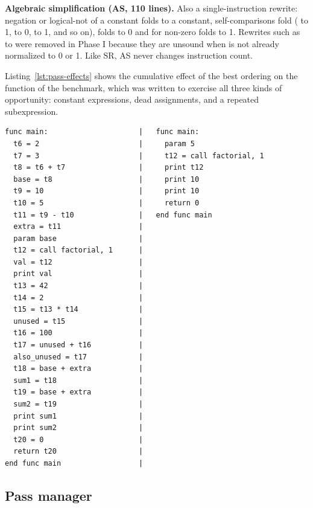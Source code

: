 \textbf{Algebraic simplification (AS, 110 lines).} Also a single-instruction rewrite: negation or logical-not of a constant folds to a constant, self-comparisons fold ( to 1,  to 0,  to 1, and so on),  folds to 0 and  for non-zero  folds to 1. Rewrites such as  to  were removed in Phase I because they are unsound when  is not already normalized to 0 or 1. Like SR, AS never changes instruction count.

Listing~\ref{lst:pass-effects} shows the cumulative effect of the best ordering on the  function of the  benchmark, which was written to exercise all three kinds of opportunity: constant expressions, dead assignments, and a repeated subexpression.

\begin{lstlisting}[language=ThreeAC, caption={The \code{main} function of \code{factorial} before optimization (left, 22 instructions excluding markers) and after CF, CSE, CP, DCE, SR, AS (right, 5 instructions). CF folded \code{base} and \code{extra}; CSE turned the second \code{base + extra} into a copy; CP replaced uses of \code{val}, \code{sum1}, \code{sum2}, \code{t20} by their sources; DCE then removed everything unread.}, label={lst:pass-effects}]
func main:                     |   func main:
  t6 = 2                       |     param 5
  t7 = 3                       |     t12 = call factorial, 1
  t8 = t6 + t7                 |     print t12
  base = t8                    |     print 10
  t9 = 10                      |     print 10
  t10 = 5                      |     return 0
  t11 = t9 - t10               |   end func main
  extra = t11                  |
  param base                   |
  t12 = call factorial, 1      |
  val = t12                    |
  print val                    |
  t13 = 42                     |
  t14 = 2                      |
  t15 = t13 * t14              |
  unused = t15                 |
  t16 = 100                    |
  t17 = unused + t16           |
  also_unused = t17            |
  t18 = base + extra           |
  sum1 = t18                   |
  t19 = base + extra           |
  sum2 = t19                   |
  print sum1                   |
  print sum2                   |
  t20 = 0                      |
  return t20                   |
end func main                  |
\end{lstlisting}

\subsection{Pass manager}

